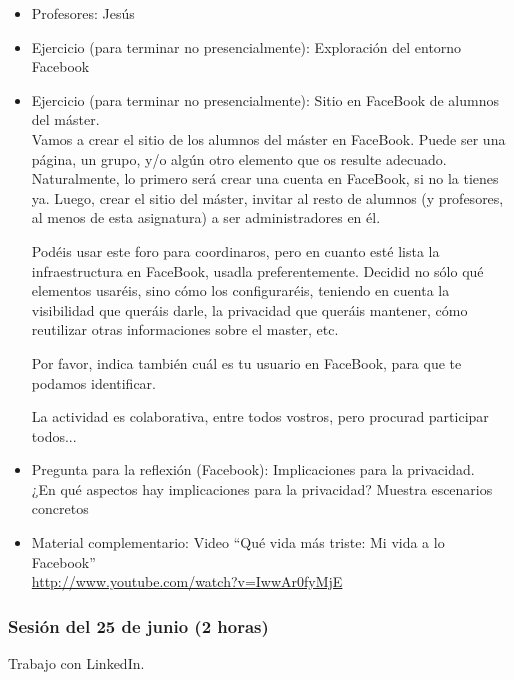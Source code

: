 \documentclass[a4paper,12pt]{article}
\begin{document}
\begin{itemize}
\item Profesores: Jesús
\item Ejercicio (para terminar no presencialmente): Exploración del entorno Facebook
\item Ejercicio (para terminar no presencialmente): Sitio en FaceBook de alumnos del máster. \\
  Vamos a crear el sitio de los alumnos del máster en FaceBook. Puede ser una página, un grupo, y/o algún otro elemento que os resulte adecuado. Naturalmente, lo primero será crear una cuenta en FaceBook, si no la tienes ya. Luego, crear el sitio del máster, invitar al resto de alumnos (y profesores, al menos de esta asignatura) a ser administradores en él.

Podéis usar este foro para coordinaros, pero en cuanto esté lista la infraestructura en FaceBook, usadla preferentemente. Decidid no sólo qué elementos usaréis, sino cómo los configuraréis, teniendo en cuenta la visibilidad que queráis darle, la privacidad que queráis mantener, cómo reutilizar otras informaciones sobre el master, etc.

Por favor, indica también cuál es tu usuario en FaceBook, para que te podamos identificar.

La actividad es colaborativa, entre todos vostros, pero procurad participar todos...
\item Pregunta para la reflexión (Facebook): Implicaciones para la privacidad. \\
  ¿En qué aspectos hay implicaciones para la privacidad? Muestra escenarios concretos
\item Material complementario: Video ``Qué vida más triste: Mi vida a lo Facebook'' \\
\url{http://www.youtube.com/watch?v=IwwAr0fyMjE}
\end{itemize}


\subsubsection{Sesión del 25 de junio (2 horas)}

Trabajo con LinkedIn.

\end{document}
